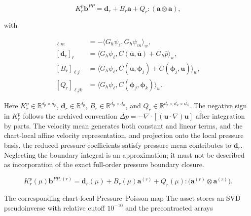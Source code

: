 \documentclass{article}
\providecommand{\DIFaddtex}[1]{{\protect\color{blue} \sf #1}} %
\providecommand{\DIFdeltex}[1]{{\protect\color{red} \scriptsize #1}} %
\providecommand{\DIFaddbegin}{} %
\providecommand{\DIFaddend}{} %
\providecommand{\DIFdelbegin}{} %
\providecommand{\DIFdelend}{} %
\providecommand{\DIFadd}[1]{\texorpdfstring{\DIFaddtex{#1}}{#1}} %
\providecommand{\DIFdel}[1]{\texorpdfstring{\DIFdeltex{#1}}{}} %
\begin{document}
{\color{blue}
\begin{equation}
 K_r^p\bm b^{PP}=\bm d_r+B_r\bm a+Q_r:(\bm a\otimes\bm a),
 \label{eq:app_pressure_poisson_system}
\end{equation}
}



\DIFadd{with
}



{\color{blue}
\begin{align}
 [K_r^p]_{\ell m}&=-\langle G_h\psi_\ell,G_h\psi_m\rangle_w,
 \label{eq:app_ppe_K_definition}\\
 [\bm d_r]_\ell&=\langle G_h\psi_\ell,C(\bar{\bm u},\bar{\bm u})+G_h\bar p\rangle_w,
 \label{eq:app_ppe_d_definition}\\
 [B_r]_{\ell j}&=\langle G_h\psi_\ell,C(\bar{\bm u},\bm\phi_j)+C(\bm\phi_j,\bar{\bm u})\rangle_w,
 \label{eq:app_ppe_B_definition}\\
 [Q_r]_{\ell jk}&=\langle G_h\psi_\ell,C(\bm\phi_j,\bm\phi_k)\rangle_w.
 \label{eq:app_ppe_Q_definition}
\end{align}
}



\DIFadd{Here $K_r^p\in\mathbb R^{d_p\times d_p}$, $\bm d_r\in\mathbb R^{d_p}$, $B_r\in\mathbb R^{d_p\times d_u}$, and $Q_r\in\mathbb R^{d_p\times d_u\times d_u}$. The negative sign in $K_r^p$ follows the archived convention $\Delta p=-\nabla\cdot[(\bm u\cdot\nabla)\bm u]$ after integration by parts. The velocity mean generates both constant and linear terms, and }\DIFaddend the \DIFdelbegin \DIFdel{chart-local affine velocity representation, and projection onto the local pressure basis, the reduced
pressure coefficients satisfy
}\DIFdelend \DIFaddbegin \DIFadd{pressure mean contributes to $\bm d_r$. Neglecting the boundary integral is an approximation; it must not be described as incorporation of the exact full-order pressure boundary closure.
}\DIFaddend 

\DIFdelbegin 
{\color{red}
\begin{equation}
    K_r^p(\mu)\bm b^{PP,(r)}
    =
    \bm d_r(\mu)
    +
    B_r(\mu)\bm a^{(r)}
    +
    Q_r(\mu):
    \bigl(
        \bm a^{(r)}\otimes\bm a^{(r)}
    \bigr).
    \label{old:eq:app_pressure_poisson_system}
\end{equation}
}

\DIFdel{The corresponding chart-local Pressure--Poisson map }\DIFdelend \DIFaddbegin \DIFadd{The asset stores an SVD pseudoinverse with relative cutoff $10^{-10}$ and the precontracted arrays
}
\end{document}

